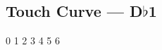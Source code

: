 \subsection{Touch Curve --- \UiKey{\I}\UiKey{\SET}D$\flat$1}









































0
1
2
3
4
5
6
